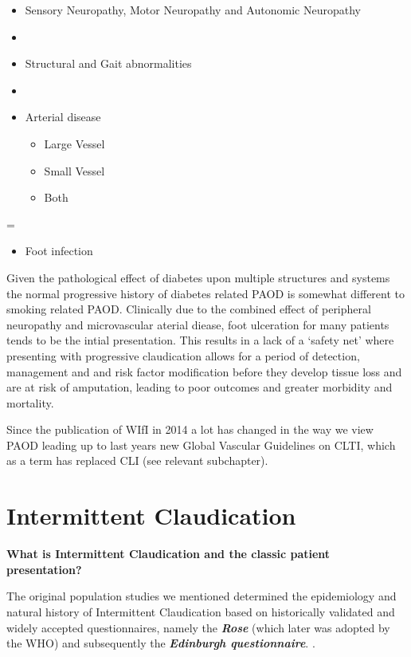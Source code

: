 \documentclass[
]{book}
\providecommand{\tightlist}{%
  \setlength{\itemsep}{0pt}\setlength{\parskip}{0pt}}
\begin{document}
\begin{itemize}
\item
  Sensory Neuropathy, Motor Neuropathy and Autonomic Neuropathy
\item
\item
  Structural and Gait abnormalities
\item
\item
  Arterial disease

  \begin{itemize}
  \item
    Large Vessel
  \item
    Small Vessel
  \item
    Both
  \end{itemize}
\end{itemize}

=

\begin{itemize}
\tightlist
\item
  Foot infection\citep{bandyk2018, kayssi2019, lepäntalo2011}
\end{itemize}

Given the pathological effect of diabetes upon multiple structures and
systems the normal progressive history of diabetes related PAOD is somewhat
different to smoking related PAOD. Clinically due to the combined effect of
peripheral neuropathy and microvascular aterial diease, foot ulceration for
many patients tends to be the intial presentation.
This results in a lack of a `safety net' where presenting with progressive
claudication allows for a period of detection, management and and risk
factor modification before they develop tissue loss and are at risk of
amputation, leading to poor outcomes and greater morbidity and mortality.

Since the publication of WIfI in 2014 a lot has changed in the way we
view PAOD leading up to last years new Global Vascular Guidelines on
CLTI, which as a term has replaced CLI (see relevant subchapter).
\citep{millsSocietyVascularSurgery2014a, conteGlobalVascularGuidelines2019a}

\hypertarget{intermittent-claudication}{%
\section{Intermittent Claudication}\label{intermittent-claudication}}

\textbf{What is Intermittent Claudication and the classic patient
presentation?}

The original population studies we mentioned determined the epidemiology
and natural history of Intermittent Claudication based on historically
validated and widely accepted questionnaires, namely the \textbf{\emph{Rose}}
\citep{roseDiagnosisIschaemicHeart1962} (which later was adopted by the WHO)
and subsequently the \textbf{\emph{Edinburgh questionnaire}}.
\citep{lendEdinburghClaudicationQuestionnaire1992}.
\end{document}
